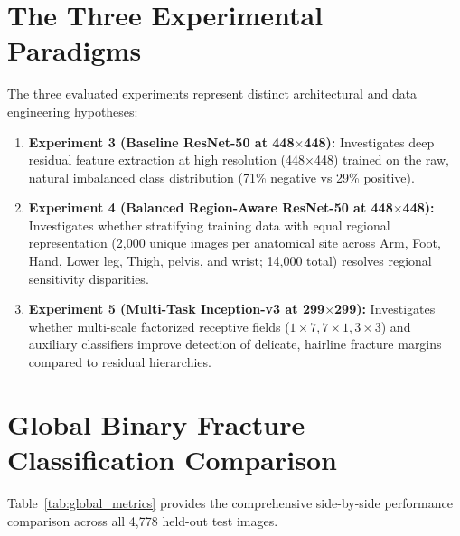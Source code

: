 \documentclass[12pt, a4paper]{report}
\begin{document}
\section{The Three Experimental Paradigms}
The three evaluated experiments represent distinct architectural and data engineering hypotheses:
\begin{enumerate}
    \item \textbf{Experiment 3 (Baseline ResNet-50 at 448$\times$448):} Investigates deep residual feature extraction at high resolution (448$\times$448) trained on the raw, natural imbalanced class distribution (71\% negative vs 29\% positive).
    \item \textbf{Experiment 4 (Balanced Region-Aware ResNet-50 at 448$\times$448):} Investigates whether stratifying training data with equal regional representation (2,000 unique images per anatomical site across Arm, Foot, Hand, Lower leg, Thigh, pelvis, and wrist; 14,000 total) resolves regional sensitivity disparities.
    \item \textbf{Experiment 5 (Multi-Task Inception-v3 at 299$\times$299):} Investigates whether multi-scale factorized receptive fields ($1\times 7, 7\times 1, 3\times 3$) and auxiliary classifiers improve detection of delicate, hairline fracture margins compared to residual hierarchies.
\end{enumerate}

\section{Global Binary Fracture Classification Comparison}
Table~\ref{tab:global_metrics} provides the comprehensive side-by-side performance comparison across all 4,778 held-out test images.
\end{document}
